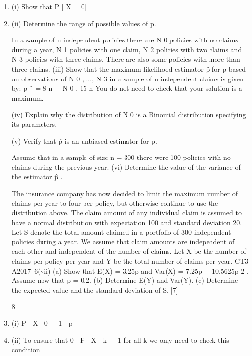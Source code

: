 \documentclass[a4paper,12pt]{article}
\begin{document}
\begin{enumerate}
[Total 8]
PLEASE TURN OVER8
An actuary models the number of claims X per year per policy as a discrete random
variable with the following distribution
Number of claims
Probability
0
*
1
p
2
3 More than 3
p/2 p/4
p/8
where p is an unknown parameter.
8 − 15 p
.

8
\item (i) Show that P [ X = 0] =
\item (ii) Determine the range of possible values of p.


In a sample of n independent policies there are N 0 policies with no claims during a
year, N 1 policies with one claim, N 2 policies with two claims and N 3 policies with
three claims. There are also some policies with more than three claims.
(iii)
Show that the maximum likelihood estimator p̂ for p based on observations of
N 0 , ..., N 3 in a sample of n independent claims is given by:
p ˆ =
8 n − N 0
.
15 n
You do not need to check that your solution is a maximum.

(iv) Explain why the distribution of N 0 is a Binomial distribution specifying its
parameters.

(v) Verify that p̂ is an unbiased estimator for p.

Assume that in a sample of size n = 300 there were 100 policies with no claims during
the previous year.
(vi)
Determine the value of the variance of the estimator p̂ .

The insurance company has now decided to limit the maximum number of claims per
year to four per policy, but otherwise continue to use the distribution above. The
claim amount of any individual claim is assumed to have a normal distribution with
expectation 100 and standard deviation 20. Let S denote the total amount claimed in a
portfolio of 300 independent policies during a year. We assume that claim amounts
are independent of each other and independent of the number of claims.
Let X be the number of claims per policy per year and Y be the total number of claims
per year.
CT3 A2017–6(vii)
(a)
Show that E(X) = 3.25p and Var(X) = 7.25p − 10.5625p 2 .
Assume now that p = 0.2.
(b) Determine E(Y) and Var(Y).
(c) Determine the expected value and the standard deviation of S.
[7]

8
\item (i) P  X  0   1  p 
\item (ii) To ensure that 0  P  X  k   1 for all k we only need to check this condition


\end{enumerate}
\end{document}
